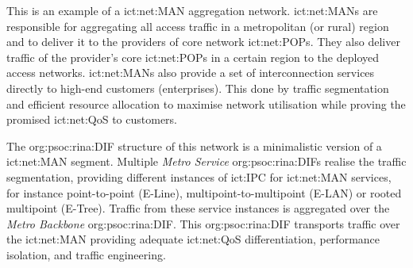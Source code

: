 This is an example of a \ac{ict:net:MAN} aggregation network.
\acp{ict:net:MAN} are responsible for aggregating all access traffic in a metropolitan (or rural) region and to deliver it to the providers of core network \acp{ict:net:POP}.
They also deliver traffic of the provider's core \acp{ict:net:POP} in a certain region to the deployed access networks.
\acp{ict:net:MAN} also provide a set of interconnection services directly to high-end customers (enterprises).
This done by traffic segmentation and efficient resource allocation to maximise network utilisation while proving the promised \ac{ict:net:QoS} to customers.

The \ac{org:psoc:rina:DIF} structure of this network is a minimalistic version of a \acs{ict:net:MAN} segment.
Multiple \textit{Metro Service} \acp{org:psoc:rina:DIF} realise the traffic segmentation, providing different instances of \ac{ict:IPC} for \acs{ict:net:MAN} services, for instance point-to-point (E-Line), multipoint-to-multipoint (E-LAN) or rooted multipoint (E-Tree).
Traffic from these service instances is aggregated over the \textit{Metro Backbone} \ac{org:psoc:rina:DIF}.
This \ac{org:psoc:rina:DIF} transports traffic over the \acs{ict:net:MAN} providing adequate \ac{ict:net:QoS} differentiation, performance isolation, and traffic engineering.

